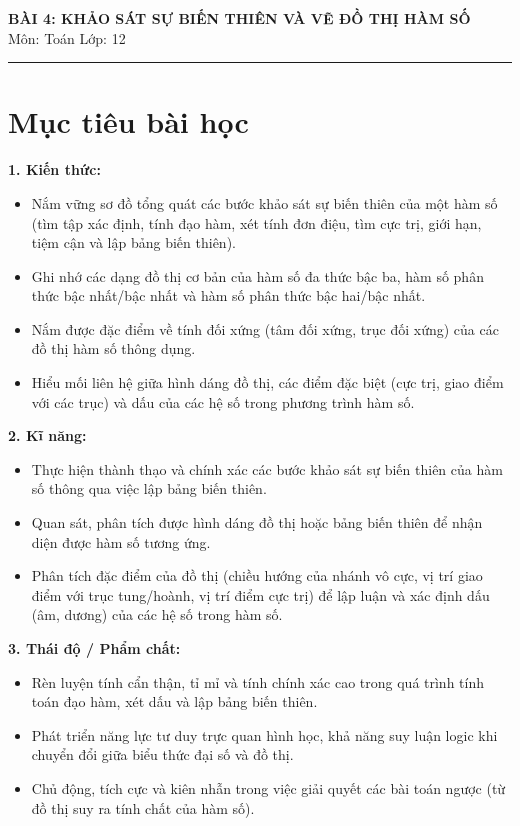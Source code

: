 \documentclass[12pt]{article}
\begin{document}
	
	\begin{center}
		{\LARGE \textbf{BÀI 4: KHẢO SÁT SỰ BIẾN THIÊN VÀ VẼ ĐỒ THỊ HÀM SỐ}}\\[4pt]
		{\large Môn: Toán \quad Lớp: 12}
	\end{center}
	\vspace{4mm}
	\hrule
	\vspace{4mm}

	\section*{Mục tiêu bài học}
	
	\textbf{1. Kiến thức:}
	\begin{itemize}
		\item Nắm vững sơ đồ tổng quát các bước khảo sát sự biến thiên của một hàm số (tìm tập xác định, tính đạo hàm, xét tính đơn điệu, tìm cực trị, giới hạn, tiệm cận và lập bảng biến thiên).
		\item Ghi nhớ các dạng đồ thị cơ bản của hàm số đa thức bậc ba, hàm số phân thức bậc nhất/bậc nhất và hàm số phân thức bậc hai/bậc nhất.
		\item Nắm được đặc điểm về tính đối xứng (tâm đối xứng, trục đối xứng) của các đồ thị hàm số thông dụng.
		\item Hiểu mối liên hệ giữa hình dáng đồ thị, các điểm đặc biệt (cực trị, giao điểm với các trục) và dấu của các hệ số trong phương trình hàm số.
	\end{itemize}
	
	\noindent \textbf{2. Kĩ năng:}
	\begin{itemize}
		\item Thực hiện thành thạo và chính xác các bước khảo sát sự biến thiên của hàm số thông qua việc lập bảng biến thiên.
		\item Quan sát, phân tích được hình dáng đồ thị hoặc bảng biến thiên để nhận diện được hàm số tương ứng.
		\item Phân tích đặc điểm của đồ thị (chiều hướng của nhánh vô cực, vị trí giao điểm với trục tung/hoành, vị trí điểm cực trị) để lập luận và xác định dấu (âm, dương) của các hệ số trong hàm số.
	\end{itemize}
	
	\noindent \textbf{3. Thái độ / Phẩm chất:}
	\begin{itemize}
		\item Rèn luyện tính cẩn thận, tỉ mỉ và tính chính xác cao trong quá trình tính toán đạo hàm, xét dấu và lập bảng biến thiên.
		\item Phát triển năng lực tư duy trực quan hình học, khả năng suy luận logic khi chuyển đổi giữa biểu thức đại số và đồ thị.
		\item Chủ động, tích cực và kiên nhẫn trong việc giải quyết các bài toán ngược (từ đồ thị suy ra tính chất của hàm số).
	\end{itemize}
	
\end{document}
